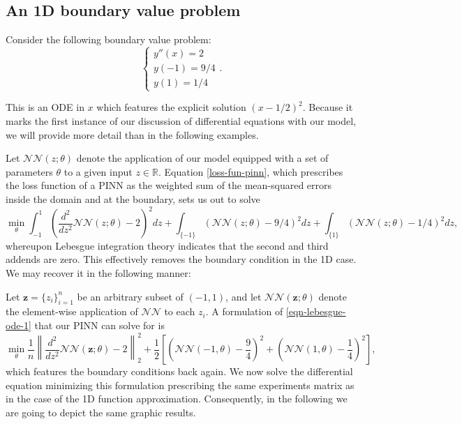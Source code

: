 \documentclass[12pt]{report} %
\newcommand{\tmmathbf}[1]{\ensuremath{\boldsymbol{#1}}}
\begin{document}
\subsection*{An 1D boundary value problem}

Consider the following boundary value problem:
\[ \left\{\begin{array}{l}
    y'' (x) = 2 \\
    y (-1) =9/4 \\
    y (1) = 1 / 4
  \end{array}\right. . \]

This is an ODE in $x$ which features the explicit solution $(x - 1 / 2)^2$.
Because it marks the first instance of our discussion of differential equations
with our model, we will provide more detail than in the following examples.

Let $\mathcal{N}\mathcal{N} (z ; \theta)$ denote the application of our
model equipped with a set of parameters $\theta$ to a given input $z \in
  \mathbb{R}$. Equation \eqref{loss-fun-pinn}, which prescribes the loss function
of a PINN as the weighted sum of the mean-squared errors inside the domain and at
the boundary, sets us out to solve
\begin{equation}
  \min_{\theta}  \int_{-1}^1 \left( \frac{d^2}{d z^2} \mathcal{N}\mathcal{N} (z ;
    \theta) - 2 \right)^2 d z + \int_{\{ -1 \}} (\mathcal{N}\mathcal{N} (z ;
  \theta) - 9 / 4)^2 d z + \int_{\{ 1 \}} (\mathcal{N}\mathcal{N} (z ;
  \theta) - 1 / 4)^2 d z, \label{eqn-lebesgue-ode-1}
\end{equation}
whereupon Lebesgue integration theory indicates that the second and third addends are zero.
This effectively removes the boundary condition in the 1D case. We may
recover it in the following manner:

Let $\tmmathbf{z}= \{ z_i \}_{i = 1}^n$ be an arbitrary subset of $(-1, 1)$,
and let $\mathcal{N}\mathcal{N} (\tmmathbf{z}; \theta)$ denote the
element-wise application of $\mathcal{N}\mathcal{N}$ to each $z_i$. A
formulation of \eqref{eqn-lebesgue-ode-1} that our PINN can solve for is
\[ \min_{\theta}  \frac{1}{n} \left\| \frac{d^2}{d z^2} \mathcal{N}\mathcal{N}
  (\tmmathbf{z}; \theta) - 2 \right\|_2^2
  + \frac{1}{2} \left[ \left(
    \mathcal{N}\mathcal{N} (-1, \theta) - \frac{9}{4} \right)^2 + \left(
    \mathcal{N}\mathcal{N} (1, \theta) - \frac{1}{4} \right)^2 \right], \]
which features the boundary conditions back again. We now solve the
differential equation minimizing this formulation prescribing the same experiments matrix as in the case of the 1D function approximation. Consequently, in the following we are going to depict the same graphic results.
\end{document}
